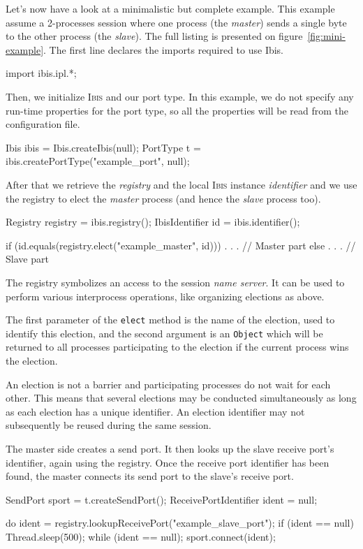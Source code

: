 \documentclass[11pt]{book}
\def\Ibis{\textsc{Ibis}\xspace}
\begin{document}
Let's now have a look at a minimalistic but complete example. This
example assume a 2-processes session where one process (the
\emph{master}) sends a single byte to the other process (the
\emph{slave}). The full listing is presented on
figure~\ref{fig:mini-example}. The first line declares the imports
required to use Ibis.
\begin{Miniverb}
import ibis.ipl.*;
\end{Miniverb}

Then, we initialize \Ibis and our port type. In this example, we do
not specify any run-time properties for the port type, so all the
properties will be read from the configuration file.
\begin{Miniverb}
      Ibis ibis  = Ibis.createIbis(null);
      PortType t = ibis.createPortType("example_port", null);
\end{Miniverb}

After that we retrieve the \emph{registry} and the local \Ibis
instance \emph{identifier} and we use the registry to elect the
\emph{master} process (and hence the \emph{slave} process too).
\begin{Miniverb}
      Registry registry = ibis.registry();
      IbisIdentifier id = ibis.identifier();

      if (id.equals(registry.elect("example_master", id))) {
        . . .  // Master part
      } else {
        . . .  // Slave  part
      }
\end{Miniverb}
The registry symbolizes an access to the session \emph{name server}.
It can be used to perform various interprocess operations, like
organizing elections as above.

The first parameter of the \texttt{elect} method is the name of the
election, used to identify this election, and the second argument is
an \texttt{Object} which will be returned to all processes
participating to the election if the current process wins the
election.

An election is not a barrier and participating processes do not wait
for each other. This means that several elections may be conducted
simultaneously as long as each election has a unique identifier. An
election identifier may not subsequently be reused during the same
session.

The master side creates a send port. It then looks up the slave
receive port's identifier, again using the registry. Once the receive
port identifier has been found, the master connects its send port to
the slave's receive port.
\begin{Miniverb}
        SendPort sport = t.createSendPort();
        ReceivePortIdentifier ident = null;

        do {
          ident = registry.lookupReceivePort("example_slave_port");
          if (ident == null) {
            Thread.sleep(500);
          }
        } while (ident == null);
        sport.connect(ident);
\end{Miniverb}
\end{document}
